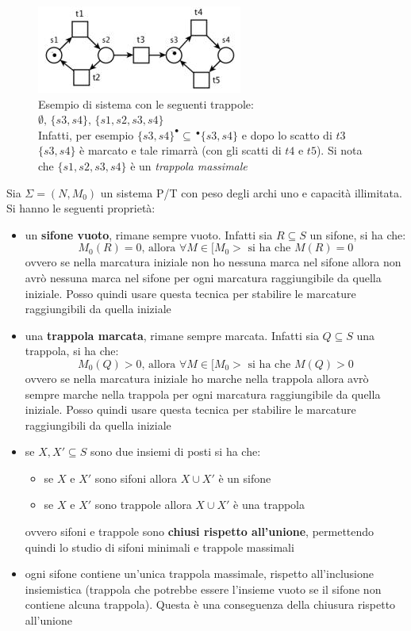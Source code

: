\documentclass[a4paper,12pt, oneside]{book}
\begin{document}
\begin{figure}[H]
  \centering
  \includegraphics[scale = 0.6]{img/sfi2.jpg}
  \caption{Esempio di sistema con le seguenti trappole: \\
    $\emptyset,\,\{s3 ,s4\},\,\{s1 , s2 , s3 , s4\}$\\
    Infatti, per esempio
    $\{s3,s4\}^\bullet\subseteq \,^\bullet\{s3,s4\}$ e dopo lo scatto di $t3$
    $\{s3,s4\}$ è marcato e tale rimarrà (con gli scatti di $t4$ e $t5$). Si
    nota che $\{s1,s2,s3,s4\}$ è un \emph{trappola massimale}}
\end{figure}
\begin{definizione}
  Sia $\Sigma=(N,M_0)$ un sistema P/T con peso degli archi uno e capacità
  illimitata. \\
  Si hanno le seguenti proprietà:
  \begin{itemize}
    \item un \textbf{sifone vuoto}, rimane sempre vuoto. Infatti sia $R\subseteq
    S$ un sifone, si ha che:
    \[M_0(R)=0\mbox{, allora }\forall M\in[M_0>\mbox{ si ha che }M(R)=0\]
    ovvero se nella marcatura iniziale non ho nessuna marca nel sifone allora
    non avrò nessuna marca nel sifone per ogni marcatura raggiungibile da quella
    iniziale. Posso quindi usare questa tecnica per stabilire le marcature
    raggiungibili da quella iniziale
    \item una \textbf{trappola marcata}, rimane sempre marcata. Infatti sia
    $Q\subseteq S$ una trappola, si ha che:
    \[M_0(Q)>0\mbox{, allora }\forall M\in[M_0>\mbox{ si ha che }M(Q)>0\]
    ovvero se nella marcatura iniziale ho marche nella trappola allora
    avrò sempre marche nella trappola per ogni marcatura raggiungibile da quella
    iniziale. Posso quindi usare questa tecnica per stabilire le marcature
    raggiungibili da quella iniziale
    \item se $X,X'\subseteq S$ sono due insiemi di posti si ha che:
    \begin{itemize}
      \item se $X$ e $X'$ sono sifoni allora $X\cup X'$ è un sifone
      \item se $X$ e $X'$ sono trappole allora $X\cup X'$ è una trappola
    \end{itemize}
    ovvero sifoni e trappole sono \textbf{chiusi rispetto all'unione},
    permettendo quindi lo studio di sifoni minimali e trappole massimali
    \item ogni sifone contiene un’unica trappola massimale, rispetto
    all’inclusione insiemistica (trappola che potrebbe essere l’insieme
    vuoto se il sifone non contiene alcuna trappola). Questa è una conseguenza
    della chiusura rispetto all'unione
  \end{itemize}
\end{definizione}
\end{document}
